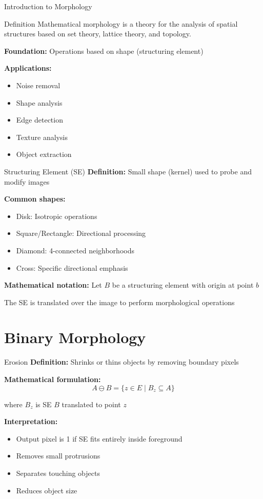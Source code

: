 \documentclass[aspectratio=169,10pt]{beamer}
\begin{document}
\begin{frame}{Introduction to Morphology}
\begin{alertblock}{Definition}
Mathematical morphology is a theory for the analysis of spatial structures based on set theory, lattice theory, and topology.
\end{alertblock}

\textbf{Foundation:} Operations based on shape (structuring element)

\textbf{Applications:}
\begin{itemize}
\item Noise removal
\item Shape analysis
\item Edge detection
\item Texture analysis
\item Object extraction
\end{itemize}
\end{frame}

\begin{frame}{Structuring Element (SE)}
\textbf{Definition:} Small shape (kernel) used to probe and modify images

\textbf{Common shapes:}
\begin{itemize}
\item Disk: Isotropic operations
\item Square/Rectangle: Directional processing
\item Diamond: 4-connected neighborhoods
\item Cross: Specific directional emphasis
\end{itemize}

\textbf{Mathematical notation:}
Let $B$ be a structuring element with origin at point $b$

The SE is translated over the image to perform morphological operations
\end{frame}

\section{Binary Morphology}

\begin{frame}{Erosion}
\textbf{Definition:} Shrinks or thins objects by removing boundary pixels

\textbf{Mathematical formulation:}
$$A \ominus B = \{z \in E \mid B_z \subseteq A\}$$

where $B_z$ is SE $B$ translated to point $z$

\textbf{Interpretation:}
\begin{itemize}
\item Output pixel is 1 if SE fits entirely inside foreground
\item Removes small protrusions
\item Separates touching objects
\item Reduces object size
\end{itemize}
\end{frame}
\end{document}
